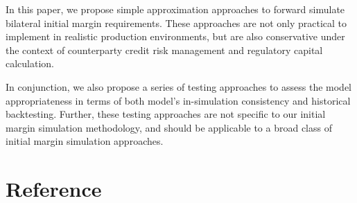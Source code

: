 \documentclass[preprint,12pt]{elsarticle}
\begin{document}
In this paper, we propose simple approximation approaches to forward simulate bilateral initial margin requirements. These approaches are not only practical to implement in realistic production environments, but are also conservative under the context of counterparty credit risk management and regulatory capital calculation.

In conjunction, we also propose a series of testing approaches to assess the model appropriateness in terms of both model's in-simulation consistency and historical backtesting. Further, these testing approaches are not specific to our initial margin simulation methodology, and should be applicable to a broad class of initial margin simulation approaches.

\clearpage

\section*{Reference}


\end{document}
